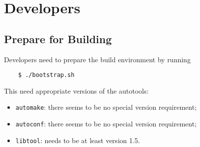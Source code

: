 \documentclass[10pt,dvips]{report}
\newcommand{\kw}[1]{\texttt{#1}}
\begin{document}
\begin{comment}
\paragraph{Run It!} \mbox{} \\
To test the system, one needs a test input file; the example 
\kw{pendulum} in the subdirectory \kw{examples} 
should do the trick.
\begin{itemize}
\item start Matlab
\item add the subdirectory \kw{contrib/SimulinkInterface} to Matlab's 
path, by executing
\begin{verbatim}
    > path('<path/to>/contrib/SimulinkInterface', path);
\end{verbatim}
\item execute simulink by clicking on the related icon, or by running
\begin{verbatim}
    > simulink
\end{verbatim}
\item open the model by clicking \kw{File->Open} on the menubar
\item run the model by clicking \kw{Simulation->Start} on the menubar.
some times, the first run fails; we're still trying to track that down.
In case, just try again...
\item for more details on creating your own model, or on editing
the interface parameters, refer to the \kw{README} 
in \kw{contrib/SimulinkInterface}
\end{itemize}

\end{comment}




\chapter{Developers}

\section{Prepare for Building}
Developers need to prepare the build environment by running
\begin{verbatim}
    $ ./bootstrap.sh
\end{verbatim}
This need appropriate versions of the autotools:
\begin{itemize}
\item \kw{automake}: there seems to be no special version requirement;
\item \kw{autoconf}: there seems to be no special version requirement;
\item \kw{libtool}: needs to be at least version 1.5.
\end{itemize}



\end{document}
